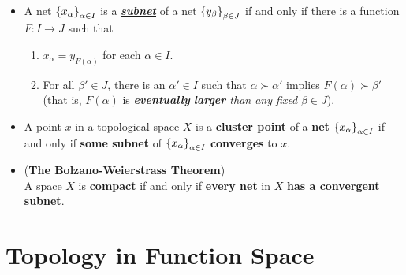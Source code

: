 \documentclass[11pt]{article}
\begin{document}
\begin{itemize}
\item \begin{definition}
A net  $\left\{x_\alpha\right\}_{\alpha \in I}$ is a \underline{\emph{\textbf{subnet}}} of a net  $\left\{y_\beta\right\}_{\beta \in J}$ if and only if there is
a function $F: I \rightarrow J$ such that
\begin{enumerate}
\item $x_\alpha = y_{F(\alpha)}$ for each $\alpha \in I$.
\item For all $\beta' \in J$, there is an $\alpha' \in I$ such that $\alpha \succ \alpha'$ implies $F(\alpha) \succ \beta'$ (that is,
$F(\alpha)$ is \emph{\textbf{eventually} \textbf{larger} than any fixed} $\beta \in J$).
\end{enumerate}
\end{definition}

\item \begin{proposition}
A point $x$ in a topological space $X$ is a \textbf{cluster point} of a \textbf{net} $\left\{x_\alpha\right\}_{\alpha \in I}$ if and only if \textbf{some subnet} of $\left\{x_\alpha\right\}_{\alpha \in I}$ \textbf{converges} to $x$.
\end{proposition}

\item \begin{theorem} (\textbf{The Bolzano-Weierstrass Theorem}) \citep{reed1980methods} \\
A space $X$ is \textbf{compact} if and only if \textbf{every net} in $X$ \textbf{has a convergent subnet}.
\end{theorem}
\end{itemize}


\section{Topology in Function Space}
\end{document}
